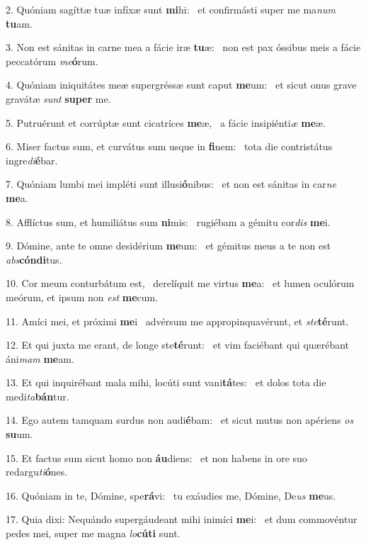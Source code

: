 2. Quóniam sagíttæ tuæ infíxæ sunt \textbf{mi}hi: \ast\  et confirmásti super me ma\textit{num} \textbf{tu}am.\

3. Non est sánitas in carne mea a fácie iræ \textbf{tu}æ: \ast\  non est pax óssibus meis a fácie peccatórum \textit{me}\textbf{ó}rum.\

4. Quóniam iniquitátes meæ supergréssæ sunt caput \textbf{me}um: \ast\  et sicut onus grave gravátæ \textit{sunt} \textbf{su}\textbf{per} me.\

5. Putruérunt et corrúptæ sunt cicatríces \textbf{me}æ, \ast\  a fácie insipiénti\textit{æ} \textbf{me}æ.\

6. Miser factus sum, et curvátus sum usque in \textbf{fi}nem: \ast\  tota die contristátus ingre\textit{di}\textbf{é}bar.\

7. Quóniam lumbi mei impléti sunt illusi\textbf{ó}nibus: \ast\  et non est sánitas in car\textit{ne} \textbf{me}a.\

8. Afflíctus sum, et humiliátus sum \textbf{ni}mis: \ast\  rugiébam a gémitu cor\textit{dis} \textbf{me}i.\

9. Dómine, ante te omne desidérium \textbf{me}um: \ast\  et gémitus meus a te non est \textit{abs}\textbf{cón}\textbf{di}tus.\

10. Cor meum conturbátum est, \dag\  derelíquit me virtus \textbf{me}a: \ast\  et lumen oculórum meórum, et ipsum non \textit{est} \textbf{me}cum.\

11. Amíci mei, et próximi \textbf{me}i \ast\  advérsum me appropinquavérunt, et \textit{ste}\textbf{té}runt.\

12. Et qui juxta me erant, de longe ste\textbf{té}runt: \ast\  et vim faciébant qui quærébant áni\textit{mam} \textbf{me}am.\

13. Et qui inquirébant mala mihi, locúti sunt vani\textbf{tá}tes: \ast\  et dolos tota die medi\textit{ta}\textbf{bán}tur.\

14. Ego autem tamquam surdus non audi\textbf{é}bam: \ast\  et sicut mutus non apériens \textit{os} \textbf{su}um.\

15. Et factus sum sicut homo non \textbf{áu}diens: \ast\  et non habens in ore suo redargu\textit{ti}\textbf{ó}nes.\

16. Quóniam in te, Dómine, spe\textbf{rá}vi: \ast\  tu exáudies me, Dómine, De\textit{us} \textbf{me}us.\

17. Quia dixi: Nequándo supergáudeant mihi inimíci \textbf{me}i: \ast\  et dum commovéntur pedes mei, super me magna \textit{lo}\textbf{cú}\textbf{ti} sunt.\

